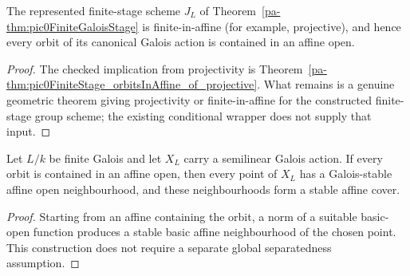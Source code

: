 \begin{theorem}
  \label{pa-thm:pic0FiniteStage_orbitsInAffine}
  \notready
  The represented finite-stage scheme \(J_L\) of
  Theorem~\ref{pa-thm:pic0FiniteGaloisStage} is finite-in-affine (for example, projective), and
  hence every orbit of its canonical Galois action is contained in an affine open.
\end{theorem}
\begin{proof}
  The checked implication from projectivity is
  Theorem~\ref{pa-thm:pic0FiniteStage_orbitsInAffine_of_projective}.  What remains is a genuine
  geometric theorem giving projectivity or finite-in-affine for the constructed finite-stage
  group scheme; the existing conditional wrapper does not supply that input.
\end{proof}

\begin{lemma}
  \label{pa-lem:finiteGalois_stableAffineCover}
  \leanok

  Let \(L/k\) be finite Galois and let \(X_L\) carry a semilinear Galois action.  If every
  orbit is contained in an affine open, then every point of \(X_L\) has a Galois-stable affine
  open neighbourhood, and these neighbourhoods form a stable affine cover.
\end{lemma}
\begin{proof}
  \leanok
  Starting from an affine containing the orbit, a norm of a suitable basic-open function
  produces a stable basic affine neighbourhood of the chosen point.  This construction does
  not require a separate global separatedness assumption.
\end{proof}

